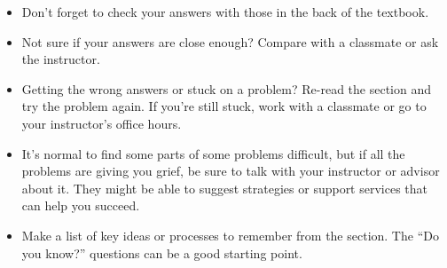 \begin{itemize}
\item Don't forget to check your answers with those in the back of the textbook. 
\item Not sure if your answers are close enough? Compare with a classmate or ask the instructor.  
\item Getting the wrong answers or stuck on a problem?  Re-read the section and try the problem again.  If you're still stuck, work with a classmate or go to your instructor's office hours.
\item It's normal to find some parts of some problems difficult, but if all the problems are giving you grief, be sure to talk with your instructor or advisor about it.  They might be able to suggest strategies or support services that can help you succeed.
\item Make a list of key ideas or processes to remember from the section.  The ``Do you know?'' questions can be a good starting point.
\end{itemize}



